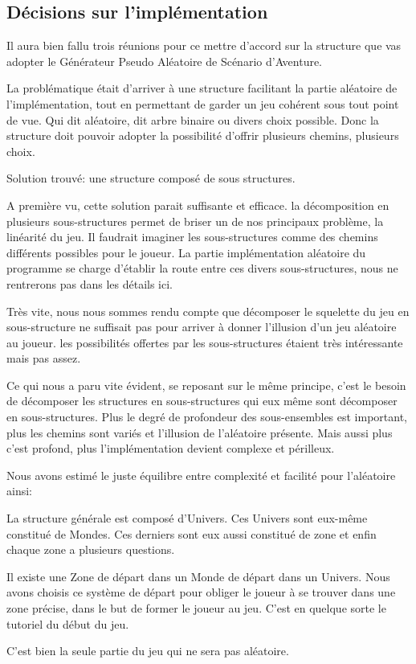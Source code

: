 \subsection{Décisions sur l'implémentation}

Il aura bien fallu trois réunions pour ce mettre d'accord sur la structure que vas adopter le Générateur Pseudo Aléatoire de Scénario d'Aventure.


La  problématique était d'arriver à une structure facilitant la partie aléatoire de l'implémentation, tout en permettant de garder un jeu cohérent sous tout point de vue.
Qui dit aléatoire, dit arbre binaire ou divers choix possible. Donc la structure doit pouvoir adopter la possibilité d'offrir plusieurs chemins, plusieurs choix.


Solution trouvé: une structure composé de sous structures.


A première vu, cette solution parait suffisante et efficace. la décomposition en plusieurs sous-structures permet de briser un de nos principaux problème, la linéarité du jeu. Il faudrait imaginer les sous-structures comme des chemins différents possibles pour le joueur. La partie implémentation aléatoire du programme se charge d'établir la route entre ces divers sous-structures, nous ne rentrerons pas dans les détails ici.


Très vite, nous nous sommes rendu compte que décomposer le squelette du jeu en sous-structure ne suffisait pas pour arriver à donner l'illusion d'un jeu aléatoire au joueur. les possibilités offertes par les sous-structures étaient très intéressante mais pas assez.


Ce qui nous a paru vite évident, se reposant sur le même principe, c'est le besoin de décomposer les structures en sous-structures qui eux même sont décomposer en sous-structures. Plus le degré de profondeur des sous-ensembles est important, plus les chemins sont variés et l'illusion de l'aléatoire présente. Mais aussi plus c'est profond, plus l'implémentation devient complexe et périlleux.


Nous avons estimé le juste équilibre entre complexité et facilité pour l'aléatoire ainsi:


La structure générale est composé d'Univers. Ces Univers sont eux-même constitué de Mondes. Ces derniers sont eux aussi constitué de zone et enfin chaque zone a plusieurs questions.


Il existe une Zone de départ dans un Monde de départ dans un Univers.
Nous avons choisis ce système de départ pour obliger le joueur à se trouver dans une zone précise, dans le but de former le joueur au jeu. C'est en quelque sorte le tutoriel du début du jeu.


C'est bien la seule partie du jeu qui ne sera pas aléatoire.